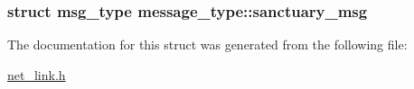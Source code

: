 \hypertarget{structmessage__type_a520d0384870088e1313600b674b03e85}{
\subsubsection[{sanctuary\-\_\-msg}]{\setlength{\rightskip}{0pt plus 5cm}struct {\bf msg\-\_\-type} message\-\_\-type\-::sanctuary\-\_\-msg}}\label{structmessage__type_a520d0384870088e1313600b674b03e85}


The documentation for this struct was generated from the following file\-:\begin{DoxyCompactItemize}
\item 
\hyperlink{net__link_8h}{net\-\_\-link.\-h}\end{DoxyCompactItemize}
